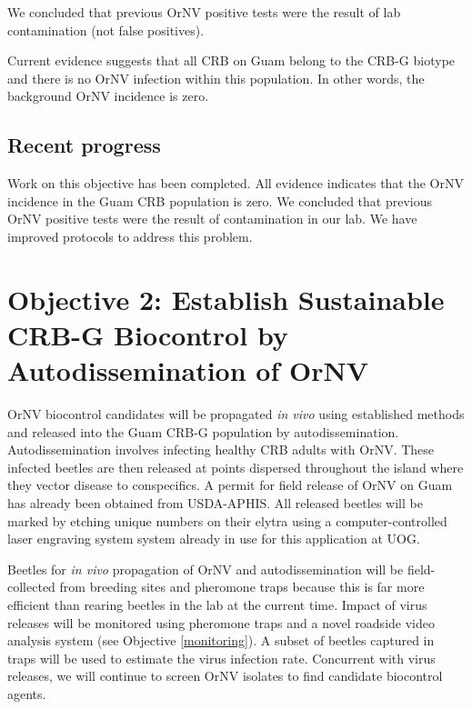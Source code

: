 \documentclass[12pt,letterpaper,english,bibliography=totocnumbered, abstract=on]{scrartcl}
\begin{document}
We concluded that previous OrNV positive tests were the result of lab contamination (not false positives). 

Current evidence suggests that all CRB on Guam belong to the CRB-G biotype and there is no OrNV infection within this population. In other words, the background OrNV incidence is zero.

\subsection{Recent progress}

Work on this objective has been completed. All evidence indicates that the OrNV incidence in the Guam CRB population is zero. We concluded that previous OrNV positive tests were the result of contamination in our lab. We have improved protocols to address this problem.

\clearpage
\section{Objective 2: Establish Sustainable CRB-G Biocontrol by Autodissemination of OrNV}

\begin{framed}
		
OrNV biocontrol candidates will be propagated \textit{in vivo} using established methods \cite{huger_oryctes_2005-1} and released into the Guam CRB-G population by autodissemination. Autodissemination involves infecting healthy CRB adults with OrNV. These infected beetles are then released at points dispersed throughout the island where they vector disease to conspecifics. A permit for field release of OrNV on Guam has already been obtained from USDA-APHIS. All released beetles will be marked by etching unique numbers on their elytra using a computer-controlled laser engraving system system already in use for this application at UOG.

Beetles for \textit{in vivo} propagation of OrNV and autodissemination will be field-collected from breeding sites and pheromone traps because this is far more efficient than rearing beetles in the lab at the current time. Impact of virus releases will be monitored using pheromone traps and a novel roadside video analysis system (see Objective \ref{monitoring}). A subset of beetles captured in traps will be used to estimate the virus infection rate. Concurrent with virus releases, we will continue to screen OrNV isolates to find candidate biocontrol agents.
\end{framed}
\end{document}
